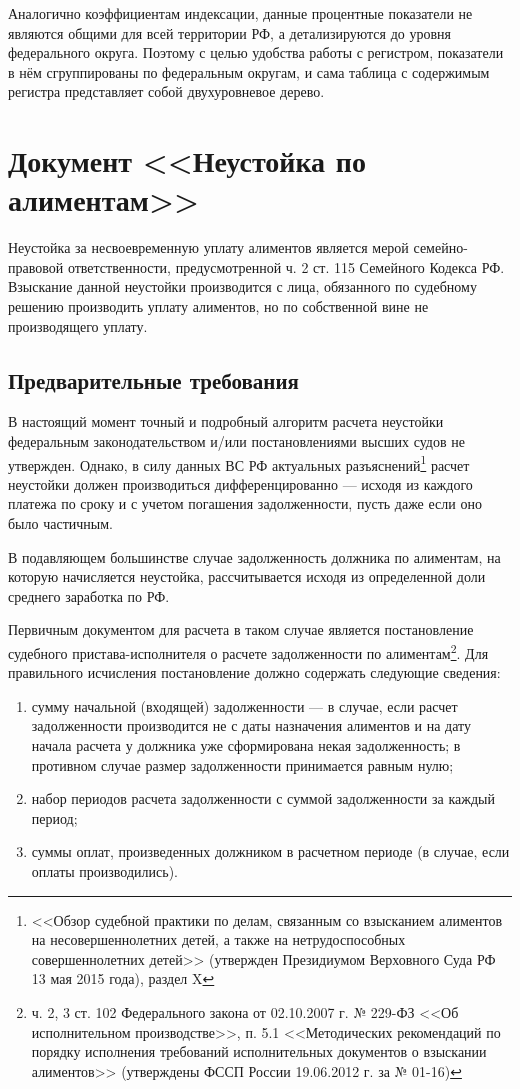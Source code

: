 \documentclass[a4paper,12pt,draft]{article}
\begin{document}
Аналогично коэффициентам индексации, данные процентные показатели не являются общими для всей территории РФ, а детализируются до уровня федерального округа. Поэтому с целью удобства работы с регистром, показатели в нём сгруппированы по федеральным округам, и сама таблица с содержимым регистра представляет собой двухуровневое дерево.
\clearpage
\section{Документ <<Неустойка по алиментам>>}

\parindent=1cm

Неустойка за несвоевременную уплату алиментов является мерой семейно-пра\-во\-вой ответственности, предусмотренной ч. 2 ст. 115 Семейного Кодекса РФ. Взыскание данной неустойки производится с лица, обязанного по судебному решению производить уплату алиментов, но по собственной вине не производящего уплату.

\subsection{Предварительные требования}
В настоящий момент точный и подробный алгоритм расчета неустойки федеральным законодательством и/или постановлениями высших судов не утвержден. Однако, в силу данных ВС РФ актуальных разъяснений\footnote{<<Обзор судебной практики по делам, связанным со взысканием алиментов на несовершеннолетних детей, а также на нетрудоспособных совершеннолетних детей>> (утвержден Президиумом Верховного Суда РФ 13 мая 2015 года), раздел X} расчет неустойки должен производиться дифференцированно --- исходя из каждого платежа по сроку и с учетом погашения задолженности, пусть даже если оно было частичным.

В подавляющем большинстве случае задолженность должника по алиментам, на которую начисляется неустойка, рассчитывается исходя из определенной доли среднего заработка по РФ.

Первичным документом для расчета в таком случае является постановление судебного пристава-исполнителя о расчете задолженности по алиментам\footnote{ч. 2, 3 ст. 102 Федерального закона от 02.10.2007 г. № 229-ФЗ <<Об исполнительном производстве>>, п. 5.1 <<Методических рекомендаций по порядку исполнения требований исполнительных документов о взыскании алиментов>> (утверждены ФССП России 19.06.2012 г. за № 01-16)}.
Для правильного исчисления постановление должно содержать следующие сведения:
\begin{enumerate}
\item сумму начальной (входящей) задолженности --- в случае, если расчет задолженности производится не с даты назначения алиментов и на дату начала расчета у должника уже сформирована некая задолженность; в противном случае размер задолженности принимается равным нулю;
\item набор периодов расчета задолженности с суммой задолженности за каждый период\label{Periody};
\item суммы оплат, произведенных должником в расчетном периоде (в случае, если оплаты производились).
\end{enumerate}
\end{document}
